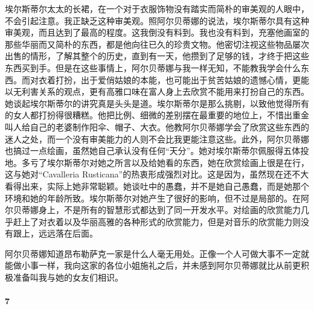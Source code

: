 \par 埃尔斯蒂尔太太的长裙，在一个对于衣服饰物没有踏实而简朴的审美观的人眼中，不会引起注意。我正缺乏这种审美观。照阿尔贝蒂娜的说法，埃尔斯蒂尔具有这种审美观，而且达到了最高的程度。这我倒没有料到。我也没有料到，充塞他画室的那些华丽而又简朴的东西，都是他向往已久的珍贵文物。他密切注视这些物品屡次出售的情形，了解其整个的历史，直到有一天，他攒到了足够的钱，才终于把这些东西买到手。但是在这些事情上，阿尔贝蒂娜与我一样无知，不能教我学会什么东西。而对衣着打扮，出于爱俏姑娘的本能，也可能出于贫苦姑娘的遗憾心情，更能以无利害关系的观点，更有高雅口味在富人身上去欣赏不能用来打扮自己的东西。她谈起埃尔斯蒂尔的讲究真是头头是道。埃尔斯蒂尔是那么挑剔，以致他觉得所有的女人都打扮得很糟糕。他把比例、细微的差别摆在最重要的地位上，不惜出重金叫人给自己的老婆制作阳伞、帽子、大衣。他教阿尔贝蒂娜学会了欣赏这些东西的迷人之处，而一个没有审美能力的人则不会比我更能注意这些。此外，阿尔贝蒂娜也搞过一点绘画，虽然她自己承认没有任何“天分”。她对埃尔斯蒂尔佩服得五体投地。多亏了埃尔斯蒂尔对她之所言以及给她看的东西，她在欣赏绘画上很是在行，这与她对“Cavalleria Rusticana”的热衷形成强烈对比。这是因为，虽然现在还不大看得出来，实际上她非常聪颖。她谈吐中的愚蠢，并不是她自己愚蠢，而是她那个环境和她的年龄所致。埃尔斯蒂尔对她产生了很好的影响，但不过是局部的。在阿尔贝蒂娜身上，不是所有的智慧形式都达到了同一开发水平。对绘画的欣赏能力几乎赶上了对衣着以及华丽高雅的各种形式的欣赏能力，但是对音乐的欣赏能力则没有跟上，远远落在后面。
\par 阿尔贝蒂娜知道昂布勒萨克一家是什么人毫无用处。正像一个人可做大事不一定就能做小事一样，我向这家的各位小姐施礼之后，并未感到阿尔贝蒂娜就比从前更积极准备叫我与她的女友们相识。


\paragraph*{7}

